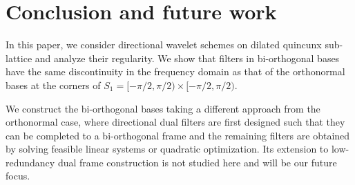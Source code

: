 \section{Conclusion and future work}\label{sec: end}
In this paper, we consider directional wavelet schemes on dilated quincunx sub-lattice and analyze their regularity. We show that filters in bi-orthogonal bases have the same discontinuity in the frequency domain as that of the orthonormal bases at the corners of $S_1 = [-\pi/2,\pi/2)\times[-\pi/2,\pi/2)$. 

 We construct the bi-orthogonal bases taking a different approach from the orthonormal case, where directional dual filters are first designed such that they can be completed to a bi-orthogonal frame and the remaining filters are obtained by solving feasible linear systems or quadratic optimization. 
 Its extension to low-redundancy dual frame construction is not studied here and will be our future focus.